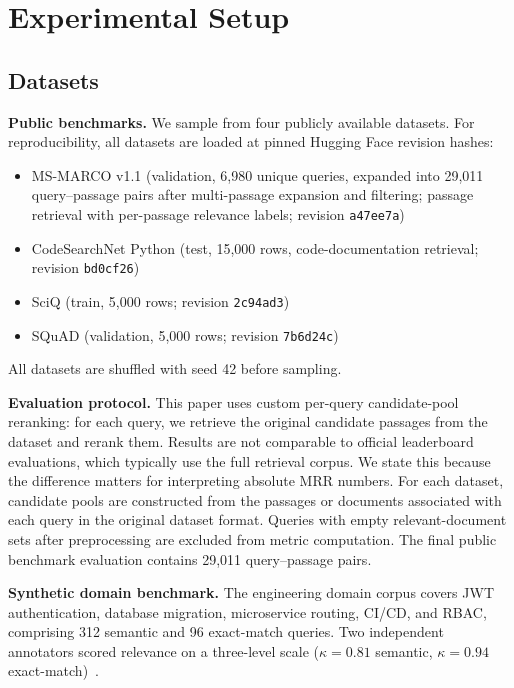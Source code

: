 \documentclass[sigconf]{acmart}
\begin{document}
\section{Experimental Setup}

\subsection{Datasets}

\textbf{Public benchmarks.} We sample from four publicly available datasets.
For reproducibility, all datasets are loaded at pinned Hugging Face revision
hashes:
\begin{itemize}
\item MS-MARCO v1.1 (validation, 6,980 unique queries, expanded into 29,011
query--passage pairs after multi-passage expansion and filtering; passage
retrieval with per-passage relevance labels; revision \texttt{a47ee7a})
\item CodeSearchNet Python (test, 15,000 rows, code-documentation retrieval;
revision \texttt{bd0cf26})
\item SciQ (train, 5,000 rows; revision \texttt{2c94ad3})
\item SQuAD (validation, 5,000 rows; revision \texttt{7b6d24c})
\end{itemize}
All datasets are shuffled with seed 42 before sampling.

\textbf{Evaluation protocol.} This paper uses custom per-query candidate-pool
reranking: for each query, we retrieve the original candidate passages from
the dataset and rerank them. Results are not comparable to official leaderboard
evaluations, which typically use the full retrieval corpus. We state this
because the difference matters for interpreting absolute MRR numbers.
For each dataset, candidate pools are constructed from the passages or
documents associated with each query in the original dataset format. Queries
with empty relevant-document sets after preprocessing are excluded from metric
computation. The final public benchmark evaluation contains 29,011
query--passage pairs.

\textbf{Synthetic domain benchmark.} The engineering domain corpus covers JWT
authentication, database migration, microservice routing, CI/CD, and RBAC,
comprising 312 semantic and 96 exact-match queries.
Two independent annotators scored relevance on a three-level scale
($\kappa = 0.81$ semantic, $\kappa = 0.94$ exact-match)~\cite{cohen1960agreement}.
\end{document}
